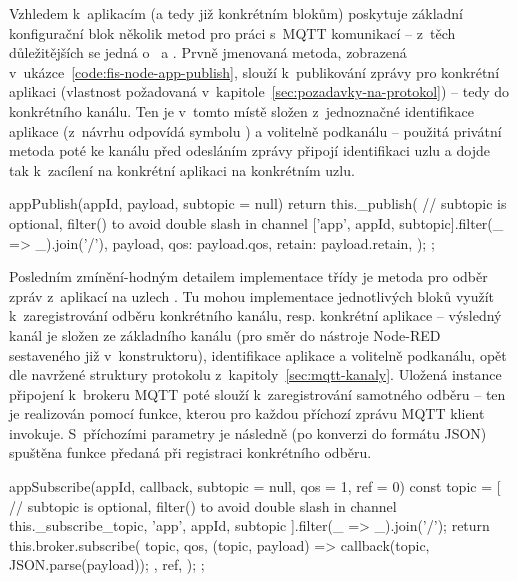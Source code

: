 Vzhledem k~aplikacím (a tedy již konkrétním blokům) poskytuje základní konfigurační blok několik metod pro práci
s~MQTT komunikací -- z~těch důležitějších se jedná o~ a .
Prvně jmenovaná metoda, zobrazená v~ukázce~\ref{code:fis-node-app-publish}, slouží k~publikování zprávy pro
konkrétní aplikaci (vlastnost požadovaná v~kapitole~\ref{sec:pozadavky-na-protokol}) -- tedy do konkrétního kanálu.
Ten je v~tomto místě složen z~jednoznačné identifikace aplikace  (z~návrhu odpovídá symbolu ) a
volitelně podkanálu -- použitá privátní metoda  poté ke kanálu před odesláním zprávy připojí identifikaci
uzlu a dojde tak k~zacílení na konkrétní aplikaci na konkrétním uzlu.

\begin{code}[
    language=Javascript,
    label=code:fis-node-app-publish,
    caption={Detail z~implementace třídy \ic{FisNode} -- metoda \ic{appPublish} poskytuje možnost konkrétnímu bloku
    odeslání zprávy do odpovídající aplikace na uzlu, resp. do konkrétního subkanálu.}
]
appPublish(appId, payload, subtopic = null) {
    return this._publish(
        // subtopic is optional, filter() to avoid double slash in channel
        ['app', appId, subtopic].filter(_ => _).join('/'),
        {
            payload,
            qos: payload.qos,
            retain: payload.retain,
        }
    );
};
\end{code}

Posledním zmínění-hodným detailem implementace třídy  je metoda pro odběr zpráv z~aplikací na uzlech
.
Tu mohou implementace jednotlivých bloků využít k~zaregistrování odběru konkrétního kanálu, resp. konkrétní aplikace
-- výsledný kanál je složen ze základního kanálu (pro směr do nástroje Node-RED sestaveného již v~konstruktoru),
identifikace aplikace  a volitelně podkanálu, opět dle navržené struktury protokolu z~kapitoly~\ref{sec:mqtt-kanaly}.
Uložená instance připojení k~brokeru MQTT poté slouží k~zaregistrování samotného odběru -- ten je realizován pomocí
funkce, kterou pro každou příchozí zprávu MQTT klient invokuje.
S~příchozími parametry je následně (po konverzi do formátu JSON) spuštěna funkce předaná při registraci konkrétního
odběru.

\begin{code}[
    language=Javascript,
    label=code:fis-node-app-subscribe,
    caption={Detail z~implementace třídy \ic{FisNode} -- metoda \ic{appSubscribe} je určená k~zaregistrování odběru
    kanálu odpovídajícího konkrétní aplikaci na konkrétním uzlu.
    Parametr \ic{qos} slouží k~nastavení konkrétní hodnoty QoS pro tento odběr, \ic{ref} je volitelná identifikace
    odběru, s jejíž pomocí lze mazat konkrétní odběry.}
]
appSubscribe(appId, callback, subtopic = null, qos = 1, ref = 0) {
    const topic = [
        // subtopic is optional, filter() to avoid double slash in channel
        this._subscribe_topic, 'app', appId, subtopic
    ].filter(_ => _).join('/');
    return this.broker.subscribe(
        topic,
        qos,
        (topic, payload) => {
            callback(topic, JSON.parse(payload));
        },
        ref,
    );
};
\end{code}

